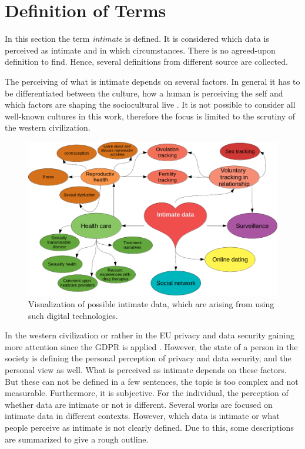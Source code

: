 \section{Definition of Terms}
\label{sec:terms_of_definition}
In this section the term \textit{intimate} is defined. It is considered which data is perceived as intimate and in which circumstances. There is no agreed-upon definition to find. Hence, several definitions from different source are collected.

The perceiving of what is intimate depends on several factors.
In general it has to be differentiated between the culture, how a human is perceiving the self and which factors are shaping the sociocultural live \cite{carrithers1985category}. It is not possible to consider all well-known cultures in this work, therefore the focus is limited to the scrutiny of the western civilization. 
\begin{figure}[htb]
	\centering
	\includegraphics[width=\linewidth]{img/cluster_heart.png}
	\caption{Visualization of possible intimate data, which are arising from using such digital technologies.}
	\label{fig:cluster}
\end{figure}
In the western civilization or rather in the \ac{EU} privacy and data security gaining more attention since the \ac{GDPR} is applied \cite{albrecht2016gdpr}.
However, the state of a person in the society is defining the personal perception of privacy and data security, and the personal view as well. What is perceived as intimate depends on these factors.
But these can not be defined in a few sentences, the topic is too complex and not measurable. Furthermore, it is subjective. For the individual, the perception of whether data are intimate or not is different. 
Several works are focused on intimate data in different contexts. However, which data is intimate or what people perceive as intimate is not clearly defined. Due to this, some descriptions are summarized to give a rough outline.

